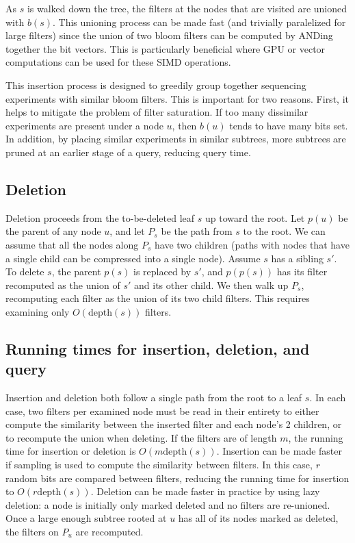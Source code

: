 \documentclass[11pt]{article}
\begin{document}
As $s$ is walked down the tree, the filters at the nodes that are visited are unioned with $b(s)$. This unioning process can be made fast (and trivially paralelized for large filters) since the union of two bloom filters can be computed by ANDing together the bit vectors. This is particularly beneficial where GPU or vector computations can be used for these SIMD operations. 

This insertion process is designed to greedily group together sequencing experiments with similar bloom filters. This is important for two reasons. First, it helps to mitigate the problem of filter saturation. If too many dissimilar experiments are present under a node $u$, then $b(u)$ tends to have many bits set. In addition, by placing similar experiments in similar subtrees, more subtrees are pruned at an earlier stage of a query, reducing query time.

\subsection{Deletion}

Deletion proceeds from the to-be-deleted leaf $s$ up toward the root. Let $p(u)$ be the parent of any node $u$, and let $P_s$ be the path from $s$ to the root. We can assume that all the nodes along $P_s$ have two children (paths with nodes that have a single child can be compressed into a single node).  Assume  $s$ has a sibling $s'$. To delete $s$, the parent $p(s)$ is replaced by $s'$, and $p(p(s))$ has its filter recomputed as the union of $s'$ and its other child. We then walk up $P_s$, recomputing each filter as the union of its two child filters. This requires examining only $O(\text{depth}(s))$ filters. 

\subsection{Running times for insertion, deletion, and query}

Insertion and deletion both follow a single path from the root to a leaf $s$. In each case, two filters per examined node must be read in their entirety to either compute the similarity between the inserted filter and each node's 2 children, or to recompute the union when deleting. If the filters are of length $m$, the running time for insertion or deletion is $O(m\text{depth}(s))$.  Insertion can be made faster if sampling is used to compute the similarity between filters. In this case, $r$ random bits are compared between filters, reducing the running time for insertion to $O(r\text{depth}(s))$. Deletion can be made faster in practice by using lazy deletion: a node is initially only marked deleted and no filters are re-unioned. Once a large enough subtree rooted at $u$ has all of its nodes marked as deleted, the filters on $P_u$ are recomputed. 
\end{document}
